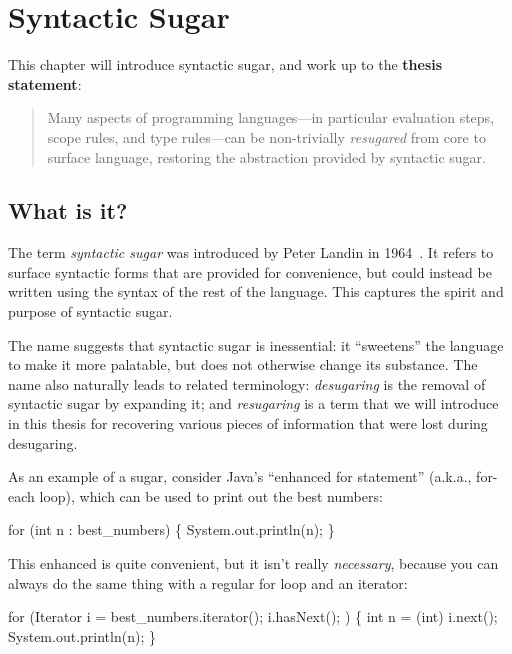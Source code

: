 \chapter{Syntactic Sugar}

This chapter will introduce syntactic sugar, and work up to the \textbf{thesis statement}:
\begin{quote}
Many aspects of programming languages---in particular evaluation
steps, scope rules, and type rules---can be non-trivially
\emph{resugared} from core to surface language, restoring the
abstraction provided by syntactic sugar.
\end{quote}

\section{What is it?}

The term \emph{syntactic sugar} was introduced by Peter Landin in
1964~\cite{syntactic-sugar}. It refers to surface syntactic forms that are provided for
convenience, but could instead be written using the syntax of the rest
of the language. This captures the spirit and purpose of syntactic
sugar.

The name suggests that syntactic sugar is inessential: it ``sweetens''
the language to make it more palatable, but does not otherwise change
its substance. The name also naturally leads to related terminology:
\emph{desugaring} is the removal of syntactic sugar by expanding it;
and \emph{resugaring} is a term that we will introduce in this thesis
for recovering various pieces of information that were lost during
desugaring.

As an example of a sugar, consider Java's ``enhanced for statement''
(a.k.a., for-each loop), which can be used to print out the best
numbers:
\begin{Codes}
for (int n : best_numbers) \{
  System.out.println(n);
\}
\end{Codes}
This enhanced  is quite convenient, but it isn't really
\emph{necessary}, because you can always do the same thing with a
regular for loop and an iterator:
\begin{Codes}
for (Iterator i = best_numbers.iterator(); i.hasNext(); ) \{
  int n = (int) i.next();
  System.out.println(n);
\}
\end{Codes}

